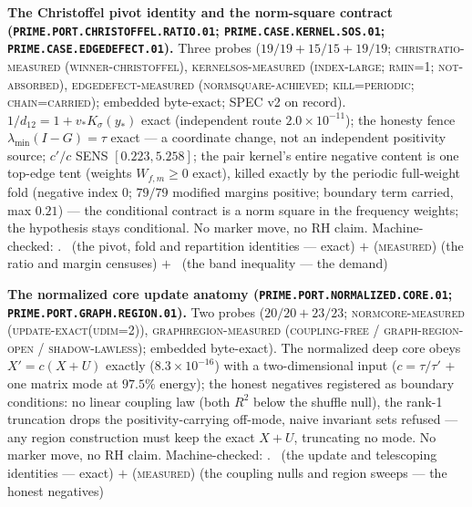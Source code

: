 \par\smallskip\noindent\textbf{The Christoffel pivot identity
and the norm-square contract
(\texttt{PRIME.PORT.CHRISTOFFEL.\allowbreak RATIO.01};
\texttt{PRIME.CASE.KERNEL.\allowbreak SOS.01};
\texttt{PRIME.CASE.\allowbreak EDGEDEFECT.01}).}
Three probes ($19/19 + 15/15 + 19/19$;
\textsc{christratio-measured (winner-christoffel)},
\textsc{kernelsos-measured (index-large; rmin=1;
not-absorbed)}, \textsc{edgedefect-measured
(normsquare-achieved; kill=periodic; chain=carried)}; embedded
byte-exact; SPEC v2 on record).  $1/d_{12} = 1 + v_{*}
K_\sigma(y_{*})$ exact (independent route $2.0\times10^{-11}$);
the honesty fence $\lambda_{\min}(I-G) = \tau$ exact --- a
coordinate change, not an independent positivity source; $c'/c$
SENS $[0.223, 5.258]$; the pair kernel's entire negative
content is one top-edge tent (weights $W_{f,m} \ge 0$ exact),
killed exactly by the periodic full-weight fold (negative index
$0$; $79/79$ modified margins positive; boundary term carried,
max $0.21$) --- the conditional contract is a norm square in
the frequency weights; the hypothesis stays conditional.  No
marker move, no RH claim.
Machine-checked: .
\mE\ (the pivot, fold and repartition identities --- exact) $+$
(\textsc{measured}) (the ratio and margin censuses) $+$ \mO\
(the band inequality --- the demand)
\par\smallskip


\par\smallskip\noindent\textbf{The normalized core update
anatomy (\texttt{PRIME.PORT.NORMALIZED.\allowbreak CORE.01};
\texttt{PRIME.PORT.GRAPH.\allowbreak REGION.01}).}
Two probes ($20/20 + 23/23$; \textsc{normcore-measured
(update-exact(udim=2))}, \textsc{graphregion-measured
(coupling-free / graph-region-open / shadow-lawless)}; embedded
byte-exact).  The normalized deep core obeys $X' = c(X + U)$
exactly ($8.3\times10^{-16}$) with a two-dimensional input ($c =
\tau/\tau'$ $+$ one matrix mode at $97.5\%$ energy); the honest
negatives registered as boundary conditions: no linear coupling
law (both $R^{2}$ below the shuffle null), the rank-1
truncation drops the positivity-carrying off-mode, naive
invariant sets refused --- any region construction must keep
the exact $X + U$, truncating no mode.  No marker move, no RH
claim.
Machine-checked: .
\mE\ (the update and telescoping identities --- exact) $+$
(\textsc{measured}) (the coupling nulls and region sweeps ---
the honest negatives)
\par\smallskip


